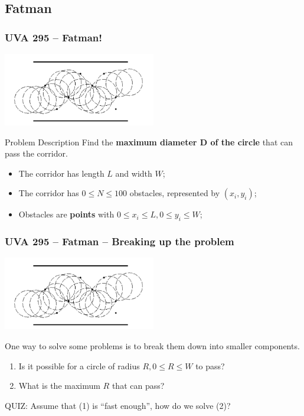 \subsection{Fatman}
\begin{frame}
  \frametitle{UVA 295 -- Fatman!}
  \begin{center}
    \includegraphics[width=0.5\textwidth]{img/fatman}
  \end{center}

  {\smaller
    \begin{block}{Problem Description}
      Find the {\bf maximum diameter D of the circle} that can pass the corridor.
      \begin{itemize}
      \item The corridor has length $L$ and width $W$;
      \item The corridor has $0 \leq N \leq 100$ obstacles, represented by $(x_i,y_i)$;
      \item Obstacles are {\bf points} with $0 \leq x_i \leq L, 0\leq y_i \leq W$;
      \end{itemize}
    \end{block}
  }
\end{frame}

\begin{frame}
  \frametitle{UVA 295 -- Fatman -- Breaking up the problem}
  \begin{center}
    \includegraphics[width=0.5\textwidth]{img/fatman}
  \end{center}

  One way to solve some problems is to break them down into smaller
  components.

  \begin{block}{}
  \begin{enumerate}
  \item Is it possible for a circle of radius $R, 0 \leq R \leq W$ to pass?
  \item What is the maximum $R$ that can pass?
  \end{enumerate}
  \end{block}

  \alert{QUIZ}: Assume that (1) is ``fast enough'', how do we solve (2)?
\end{frame}

